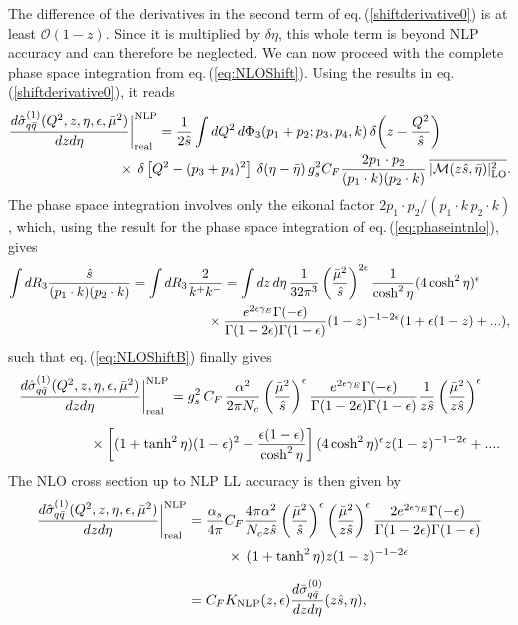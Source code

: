 \documentclass[11pt]{article}
\newcommand{\nn}{\nonumber}
\newcommand{\eps}{\epsilon}
\newcommand{\s}{\hat{s}}
\newcommand\eqn[1]     {eq.\,(\ref{#1})}
\begin{document}
The difference of the derivatives in the second term of \eqn{shiftderivative0} is at least $\mathcal{O}(1-z)$. Since it is multiplied by $\delta\eta$, this whole term is beyond NLP accuracy and can therefore be neglected. We can now 
proceed with the complete phase space integration from 
\eqn{eq:NLOShift}. Using the results in 
\eqn{shiftderivative0}, it reads
\begin{align}\label{eq:NLOShiftB} \nn
\frac{d\hat{\sigma}_{q\bar{q}}^{(1)}(Q^2,z,\eta,\epsilon,\bar\mu^2)}{dzd\eta}\bigg|_{\text{real}}^{\text{NLP}} &= 
\frac{1}{2\hat s}
\int dQ^2 \, d\Phi_3(p_1+p_2; p_3,p_4,k)
\, \delta\bigg(z - \frac{Q^2}{\hat s} \bigg) \\
&\hspace{-1.0cm}\times\,
\delta\left[Q^2-(p_3+p_4)^2\right] \, 
\delta(\eta-\bar{\eta})\, g_s^2C_F\frac{2p_1\cdot p_2}{(p_1\cdot k)(p_2\cdot k)}\, \overline{|\mathcal{M}(z\hat{s},\bar \eta)|_\text{LO}^2}.
\end{align}
The phase space integration involves only the 
eikonal factor $2p_1\cdot p_2/(p_1\cdot k \, p_2\cdot k)$,
which, using the result for the phase space integration of \eqn{eq:phaseintnlo}, gives
\begin{align} \nn
\int dR_3 \frac{\hat{s}}{(p_1\cdot k)(p_2\cdot k)} 
&= \int dR_3 \frac{2}{k^+k^-} 
=\int dz\, d\eta\,\frac{1}{32\pi^3}
\left(\frac{\bar\mu^2}{\s}\right)^{2\epsilon}
\frac{1}{\cosh^2\eta}(4\cosh^2\eta)^\epsilon  \\
&\hspace{2.0cm}\times \frac{e^{2\eps\gamma_E}\Gamma(-\epsilon)}{\Gamma(1-2\epsilon)\Gamma(1-\epsilon)}(1-z)^{-1-2\epsilon} (1+\epsilon(1-z)+...),
\end{align}
such that \eqn{eq:NLOShiftB} finally gives
\begin{align} \nn
\frac{d\hat{\sigma}_{q\bar{q}}^{(1)}(Q^2,z,\eta,\epsilon,\bar\mu^2)}{dzd\eta}\bigg|_{\text{real}}^{\text{NLP}} & = 
g_s^2\,C_F\,\frac{\alpha^2}{2\pi N_c}\left(\frac{\bar\mu^2}{\s}\right)^{\epsilon}\frac{e^{2\eps\gamma_E}\Gamma(-\epsilon)}{\Gamma(1-2\epsilon)\Gamma(1-\epsilon)} \frac{1}{z\s}\left(\frac{\bar\mu^2}{z\s}\right)^{\epsilon} \\[0.2cm]
&\hspace{-2.0cm}\times\left[(1+\tanh^2\eta)(1-\epsilon)^2-\frac{\epsilon(1-\epsilon)}{\cosh^2\eta}\right](4\cosh^2\eta)^\epsilon z(1-z)^{-1-2\epsilon}+....
\end{align}
The NLO cross section up to NLP LL accuracy is then given by 
\begin{align}\label{universality-result} \nn
\frac{d\hat{\sigma}_{q\bar{q}}^{(1)}(Q^2,z,\eta,\epsilon,\bar\mu^2)}{dzd\eta}\bigg|_{\text{real}}^{\text{NLP}} &= \frac{\alpha_s}{4\pi}C_F\frac{ 4\pi\alpha^2}{ N_cz\hat{s}}\left(\frac{\bar\mu^2}{\s}\right)^{\epsilon}\left(\frac{\bar\mu^2}{z\s}\right)^{\epsilon}\frac{2e^{2\eps\gamma_E}\Gamma(-\epsilon)}{\Gamma(1-2\epsilon)\Gamma(1-\epsilon)} 
\\[0.1cm] \nn
&\hspace{1.0cm}\times\, (1+\tanh^2\eta)
z(1-z)^{-1-2\epsilon} \\[0.2cm]
&= C_F K_\text{NLP}(z,\epsilon)
\frac{d\bar{\sigma}_{q\bar{q}}^{(0)}}{dzd\eta}(z\s,\eta),
\end{align}
\end{document}

